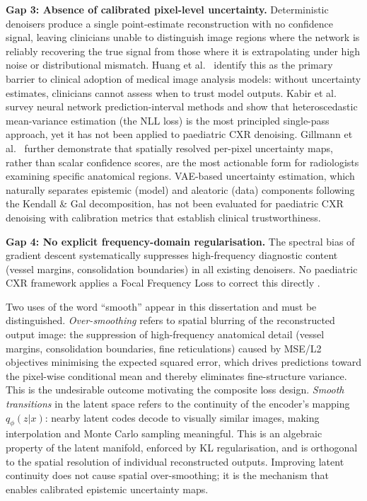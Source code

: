 \documentclass[12pt, a4paper, twoside, openright]{book}
\begin{document}
\textbf{Gap 3: Absence of calibrated pixel-level uncertainty.} Deterministic denoisers produce a single point-estimate reconstruction with no confidence signal, leaving clinicians unable to distinguish image regions where the network is reliably recovering the true signal from those where it is extrapolating under high noise or distributional mismatch. Huang et al.\ \cite{huang_review_2024} identify this as the primary barrier to clinical adoption of medical image analysis models: without uncertainty estimates, clinicians cannot assess when to trust model outputs. Kabir et al.\ \cite{kabir_neural_2018} survey neural network prediction-interval methods and show that heteroscedastic mean-variance estimation (the NLL loss) is the most principled single-pass approach, yet it has not been applied to paediatric CXR denoising. Gillmann et al.\ \cite{gillmann_uncertainty_2021} further demonstrate that spatially resolved per-pixel uncertainty maps, rather than scalar confidence scores, are the most actionable form for radiologists examining specific anatomical regions. VAE-based uncertainty estimation, which naturally separates epistemic (model) and aleatoric (data) components following the Kendall \& Gal \cite{kendall_what_2017} decomposition, has not been evaluated for paediatric CXR denoising with calibration metrics that establish clinical trustworthiness.

\textbf{Gap 4: No explicit frequency-domain regularisation.} The spectral bias of gradient descent \cite{rahaman_spectral_2019, xu_frequency_2020} systematically suppresses high-frequency diagnostic content (vessel margins, consolidation boundaries) in all existing denoisers. No paediatric CXR framework applies a Focal Frequency Loss \cite{jiang_focal_2021} to correct this directly \cite{durall_watch_2020}.

Two uses of the word ``smooth'' appear in this dissertation and must be distinguished. \emph{Over-smoothing} refers to spatial blurring of the reconstructed output image: the suppression of high-frequency anatomical detail (vessel margins, consolidation boundaries, fine reticulations) caused by MSE/L2 objectives minimising the expected squared error, which drives predictions toward the pixel-wise conditional mean and thereby eliminates fine-structure variance. This is the undesirable outcome motivating the composite loss design. \emph{Smooth transitions} in the latent space refers to the continuity of the encoder's mapping $q_\phi(z|x)$: nearby latent codes decode to visually similar images, making interpolation and Monte Carlo sampling meaningful. This is an algebraic property of the latent manifold, enforced by KL regularisation, and is orthogonal to the spatial resolution of individual reconstructed outputs. Improving latent continuity does not cause spatial over-smoothing; it is the mechanism that enables calibrated epistemic uncertainty maps.
\end{document}
